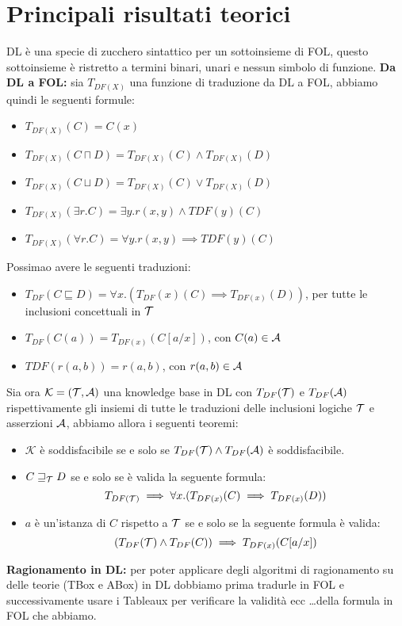 \documentclass[../main.tex]{subfiles}
\begin{document}
   \section{Principali risultati teorici}
   DL è una specie di zucchero sintattico per un sottoinsieme di FOL, questo sottoinsieme è ristretto a termini binari, unari e nessun simbolo di funzione.
   \spazio
   \textbf{Da DL a FOL:} sia $T_{DF(X)}$ una funzione di traduzione da DL a FOL, abbiamo quindi le seguenti formule:
   \begin{itemize}
      \item $T_{DF(X)}(C) = C(x)$
      \item $T_{DF(X)}(C \sqcap D) = T_{DF(X)}(C) \land T_{DF(X)}(D)$
      \item $T_{DF(X)}(C \sqcup D) = T_{DF(X)}(C) \lor T_{DF(X)}(D)$
      \item $T_{DF(X)}(\exists r.C) = \exists y.r(x, y) \land TDF(y)(C)$
      \item $T_{DF(X)}(\forall r.C) = \forall y.r(x, y) \implies TDF(y)(C)$
   \end{itemize}
   Possimao avere le seguenti traduzioni:
   \begin{itemize}
      \item $T_{DF} (C \sqsubseteq D) = \forall x.(T_{DF}(x)(C) \implies T_{DF(x)}(D))$, per tutte le inclusioni concettuali in $\mathcal{T}$
      \item $T_{DF} (C(a)) = T_{DF(x)}(C[a/x])$, con $C(a) \in \mathcal{A}$
      \item $TDF (r(a, b)) = r(a, b)$, con $r(a,b) \in \mathcal{A}$
   \end{itemize}
   Sia ora $\mathcal{K}= (\mathcal{T},\mathcal{A})$ una knowledge base in DL con $T_{DF}(\mathcal{T})$ e $T_{DF}(\mathcal{A})$ rispettivamente gli insiemi di tutte le traduzioni delle inclusioni logiche $\mathcal{T}$ e asserzioni $\mathcal{A}$, abbiamo allora i seguenti teoremi:
   \begin{itemize}
      \item $\mathcal{K}$ è soddisfacibile se e solo se $T_{DF}(\mathcal{T}) \land T_{DF}(\mathcal{A})$ è soddisfacibile.
      \item $C \sqsupseteq_{\mathcal{T}} D$ se e solo se è valida la seguente formula:
         \begin{equation*}
            T_{DF(\mathcal{T})} \implies \forall x.(T_{DF(x)}(C) \implies T_{DF(x)}(D))
         \end{equation*}
      \item $a$ è un'istanza di $C$ rispetto a $\mathcal{T}$ se e solo se la seguente formula è valida:
         \begin{equation*}
            (T_{DF}(\mathcal{T}) \land T_{DF}(C)) \implies T_{DF(x)}(C[a/x])
         \end{equation*}
   \end{itemize}
   \vspace{2em}
   \textbf{Ragionamento in DL:} per poter applicare degli algoritmi di ragionamento su delle teorie (TBox e ABox) in DL dobbiamo prima tradurle in FOL e successivamente usare i Tableaux per verificare la validità ecc \dots della formula in FOL che abbiamo.
\end{document}
